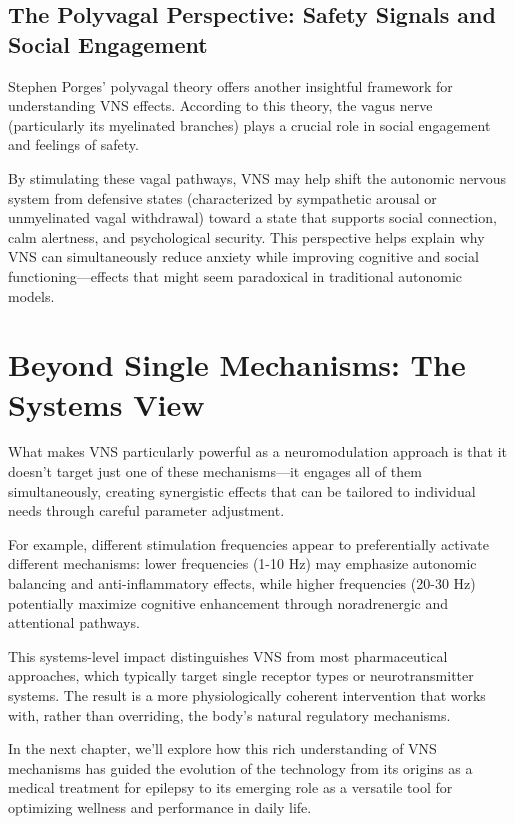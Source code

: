 \documentclass[
  Letterpaper,
]{scrbook}
\begin{document}
\subsection{The Polyvagal Perspective: Safety Signals and Social
Engagement}\label{the-polyvagal-perspective-safety-signals-and-social-engagement}

Stephen Porges' polyvagal theory offers another insightful framework for
understanding VNS effects. According to this theory, the vagus nerve
(particularly its myelinated branches) plays a crucial role in social
engagement and feelings of safety.

By stimulating these vagal pathways, VNS may help shift the autonomic
nervous system from defensive states (characterized by sympathetic
arousal or unmyelinated vagal withdrawal) toward a state that supports
social connection, calm alertness, and psychological security. This
perspective helps explain why VNS can simultaneously reduce anxiety
while improving cognitive and social functioning---effects that might
seem paradoxical in traditional autonomic models.

\section{Beyond Single Mechanisms: The Systems
View}\label{beyond-single-mechanisms-the-systems-view}

What makes VNS particularly powerful as a neuromodulation approach is
that it doesn't target just one of these mechanisms---it engages all of
them simultaneously, creating synergistic effects that can be tailored
to individual needs through careful parameter adjustment.

For example, different stimulation frequencies appear to preferentially
activate different mechanisms: lower frequencies (1-10 Hz) may emphasize
autonomic balancing and anti-inflammatory effects, while higher
frequencies (20-30 Hz) potentially maximize cognitive enhancement
through noradrenergic and attentional pathways.

This systems-level impact distinguishes VNS from most pharmaceutical
approaches, which typically target single receptor types or
neurotransmitter systems. The result is a more physiologically coherent
intervention that works with, rather than overriding, the body's natural
regulatory mechanisms.

In the next chapter, we'll explore how this rich understanding of VNS
mechanisms has guided the evolution of the technology from its origins
as a medical treatment for epilepsy to its emerging role as a versatile
tool for optimizing wellness and performance in daily life.
\end{document}
